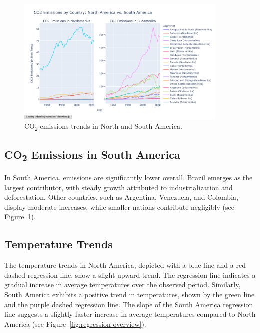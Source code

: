 \documentclass[a4paper,11pt]{article}
\begin{document}
\begin{figure}[htbp]
    \centering
    \includegraphics[width=0.9\textwidth]{pics/co2_emissions_large_graph.pdf} 
    \caption{CO\textsubscript{2} emissions trends in North and South America.}
    \label{fig:co2-emissions}
\end{figure}

\subsection{CO\textsubscript{2} Emissions in South America}
In South America, emissions are significantly lower overall. Brazil emerges as the largest contributor, with steady growth attributed to industrialization and deforestation. Other countries, such as Argentina, Venezuela, and Colombia, display moderate increases, while smaller nations contribute negligibly (see Figure~\ref{fig:co2-emissions}).

\bigskip

\subsection{Temperature Trends}
The temperature trends in North America, depicted with a blue line and a red dashed regression line, show a slight upward trend. The regression line indicates a gradual increase in average temperatures over the observed period. Similarly, South America exhibits a positive trend in temperatures, shown by the green line and the purple dashed regression line. The slope of the South America regression line suggests a slightly faster increase in average temperatures compared to North America (see Figure~\ref{fig:regression-overview}).
\end{document}
